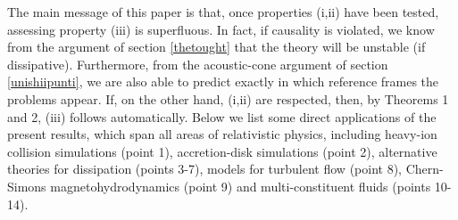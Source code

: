 \documentclass[a4paper, amsfonts, amssymb, amsmath, reprint, showkeys,  twoside, onecolumn,notitlepage,nofootinbib]{revtex4-1}
\theoremstyle{definition}
\theoremstyle{theorem}
\begin{document}
The main message of this paper is that, once properties (i,ii) have been tested, assessing property (iii) is superfluous. In fact, if causality is violated, we know from the argument of section \ref{thetought} that the theory will be unstable (if dissipative). Furthermore, from the acoustic-cone argument of section \ref{unishiipunti}, we are also able to predict exactly in which reference frames the problems appear. If, on the other hand, (i,ii) are respected, then, by Theorems 1 and 2, (iii) follows automatically. Below we list some direct applications of the present results, which span all areas of relativistic physics, including heavy-ion collision simulations (point 1), accretion-disk simulations (point 2), alternative theories for dissipation (points 3-7), models for turbulent flow (point 8), Chern-Simons magnetohydrodynamics (point 9) and multi-constituent fluids (points 10-14).
\end{document}
